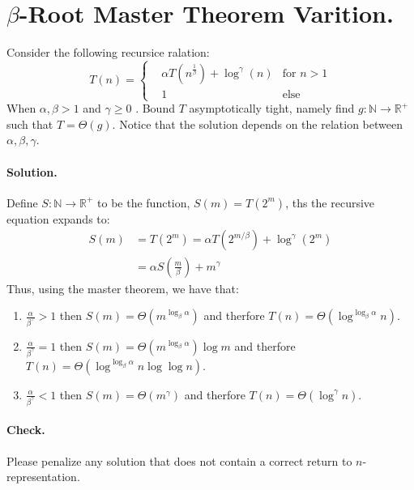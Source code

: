 \section{$\beta$-Root Master Theorem Varition.}
Consider the following recursice ralation: 
\begin{equation*}
    T\left(n\right)  = \left\{ \begin{array}{rcl}
        & \alpha T(n^{\frac{1}{\beta}}) + \log^{\gamma} \left( n \right)  & \mbox{for }  n > 1  \\
      & 1 & \mbox{else}  
  \end{array} \right. 
\end{equation*}
When $\alpha, \beta > 1 $ and $\gamma \ge 0$ . Bound $T$ asymptotically tight, namely find $g: \mathbb{N} \rightarrow \mathbb{R}^{+}$ such that $T = \Theta(g)$. Notice that the solution depends on the relation between $\alpha, \beta, \gamma$.

\ifdefined\SOLUTION
  \paragraph{Solution.}
  Define $S : \mathbb{N} \rightarrow \mathbb{R}^{+}$ to be the function, $S(m) = T(2^{m})$, ths the recursive equation expands to:
  \begin{equation*}
    \begin{split}
      S(m) & = T(2^{m}) = \alpha T(2^{m/\beta}) + \log^{\gamma}(2^{m}) \\
      &= \alpha S(\frac{m}{\beta}) + m^{\gamma}
    \end{split}
  \end{equation*}
  Thus, using the master theorem, we have that: 
  \begin{enumerate}
    \item $ \frac{\alpha}{\beta^{\gamma}} > 1 $ then $S(m) = \Theta(m^{\log_{\beta}\alpha})$ and therfore $T(n) = \Theta( \log^{\log_{\beta}\alpha} n)$. 
    \item  $ \frac{\alpha}{\beta^{\gamma}} = 1 $ then $S(m) = \Theta(m^{\log_{\beta}\alpha})\log m$ and therfore $T(n) = \Theta( \log^{\log_{\beta}\alpha} n \log \log n)$. 
    \item $ \frac{\alpha}{\beta^{\gamma}} < 1 $ then $S(m) = \Theta(m^{\gamma})$ and therfore $T(n) = \Theta( \log^{\gamma} n)$. 
  \end{enumerate}

\ifdefined\CHECK
  \paragraph{Check.} Please penalize any solution that does not contain a correct return to $n$-representation.
\fi

